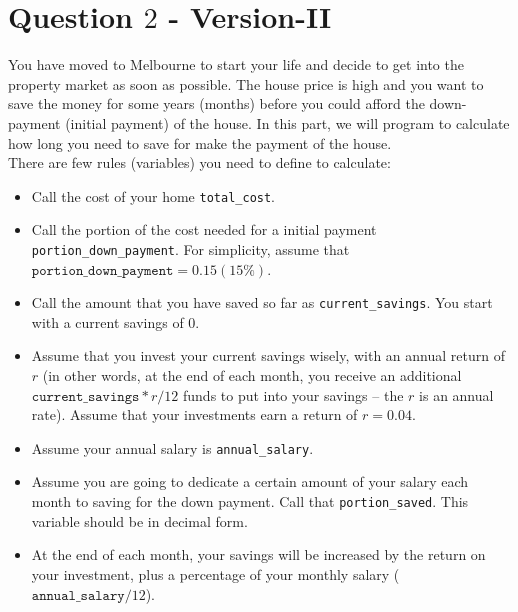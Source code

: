 \documentclass[a4paper]{article}
\begin{document}
    
    
    \section{Question $2$ - Version-II}
    
    \begin{answer}
    
   You have moved to Melbourne to start your life and decide to get into the property market as soon as possible. The house price is high and you want to save the money for some years (months) before you could afford the down-payment (initial payment) of the house. In this part, we will program to calculate how long you need to save for make the payment of the house. \\

   There are few rules (variables) you need to define to calculate:
   \begin{itemize}
       \item Call the cost of your home \texttt{total_cost}.
       \item Call the portion of the cost needed for a initial payment \texttt{portion_down_payment}. For simplicity, assume that $\texttt{portion_down_payment} = 0.15 (15\%)$.
       \item Call the amount that you have saved so far as  \texttt{current_savings}. You start with a current savings of $0$.
       \item Assume that you invest your current savings wisely, with an annual return of $r$ (in other words, at the end of each month, you receive an additional $\texttt{current_savings}*r/12$ funds to put into your savings – the $r$ is an annual rate). Assume that your investments earn a return of $r = 0.04$.
       \item Assume your annual salary is \texttt{annual_salary}.
       \item Assume you are going to dedicate a certain amount of your salary each month to saving for the down payment. Call that \texttt{portion_saved}. This variable should be in decimal form.
       \item At the end of each month, your savings will be increased by the return on your investment, plus a percentage of your monthly salary ($\texttt{annual_salary} / 12$).
   \end{itemize}





\end{answer}
\end{document}
